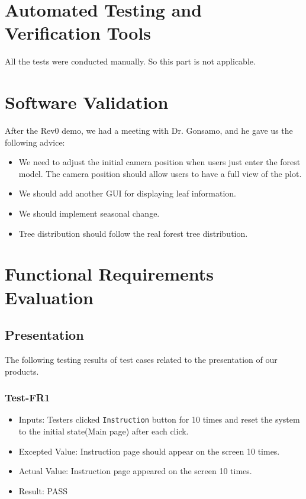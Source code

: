 \documentclass[12pt, titlepage]{article}
\begin{document}
\section{Automated Testing and Verification Tools}
All the tests were conducted manually. So this part is not applicable.

\section{Software Validation}
After the Rev0 demo, we had a meeting with Dr. Gonsamo, and he gave us the following 
advice:
\begin{itemize}
\item We need to adjust the initial camera position when users just enter the 
forest model. The camera position should allow users to have a full view of the 
plot.
\item We should add another GUI for displaying leaf information.
\item We should implement seasonal change.
\item Tree distribution should follow the real forest tree distribution.
\end{itemize}

\newpage


\section{Functional Requirements Evaluation}
\subsection{Presentation}
\noindent The following testing results of test cases 
related to the presentation of our products.

\newcommand{\pass}{{\color{Green}PASS}}
\newcommand{\fail}{{\color{Red}FAIL}}

\subsubsection{Test-FR1}
\begin{itemize}
\item Inputs: Testers clicked \verb|Instruction| button
for 10 times and reset the system to the initial 
state(Main page) after each click.
\item Excepted Value: Instruction page should appear 
on the screen 10 times.
\item Actual Value: Instruction page appeared on the 
screen 10 times.
\item Result: \pass
\end{itemize}
\end{document}
